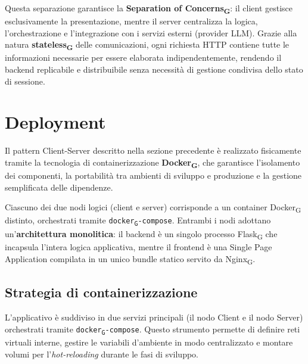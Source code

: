 \documentclass[11pt,a4paper]{article}
\newcommand{\gls}[1]{#1\textsubscript{G}}
\begin{document}
Questa separazione garantisce la \textbf{\gls{Separation of Concerns}}: il client gestisce esclusivamente la presentazione, mentre il server centralizza la logica, l'orchestrazione e l'integrazione con i servizi esterni (provider LLM). Grazie alla natura \textbf{\gls{stateless}} delle comunicazioni, ogni richiesta HTTP contiene tutte le informazioni necessarie per essere elaborata indipendentemente, rendendo il backend replicabile e distribuibile senza necessità di gestione condivisa dello stato di sessione.

\newpage

\section{Deployment}
Il pattern Client-Server descritto nella sezione precedente è realizzato fisicamente tramite la tecnologia di containerizzazione \textbf{\gls{Docker}}, che garantisce l'isolamento dei componenti, la portabilità tra ambienti di sviluppo e produzione e la gestione semplificata delle dipendenze.

Ciascuno dei due nodi logici (client e server) corrisponde a un container 
\gls{Docker} distinto, orchestrati tramite \texttt{\gls{docker}-compose}. 
Entrambi i nodi adottano un'\textbf{architettura monolitica}: il backend 
è un singolo processo \gls{Flask} che incapsula l'intera logica applicativa, 
mentre il frontend è una Single Page Application compilata in un unico bundle 
statico servito da \gls{Nginx}.

\subsection{Strategia di containerizzazione}
L'applicativo è suddiviso in due servizi principali (il nodo Client e il nodo Server) orchestrati tramite \texttt{\gls{docker}-compose}. Questo strumento permette di definire reti virtuali interne, gestire le variabili d'ambiente in modo centralizzato e montare volumi per l'\textit{hot-reloading} durante le fasi di sviluppo.
\end{document}
